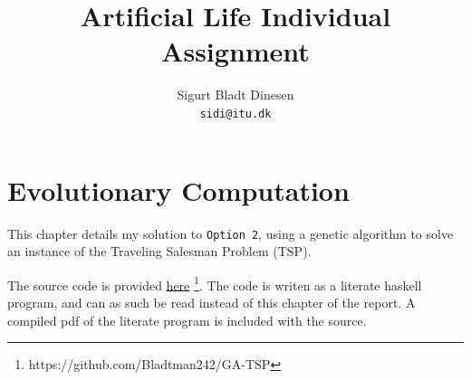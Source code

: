 \documentclass[a4paper, titlepage]{report}
\renewcommand{\%}{\scalebox{.9}{\oldpct}}
\begin{document}
\title{Artificial Life Individual Assignment}
\author{
	Sigurt Bladt Dinesen
	\\\texttt{sidi@itu.dk}
}

\maketitle

\tableofcontents
\chapter{Evolutionary Computation}
This chapter details my solution to \texttt{Option 2}, using a genetic algorithm
to solve an instance of the Traveling Salesman Problem (TSP).

The source code is provided \href{https://github.com/Bladtman242/GA-TSP}{here}
\footnote{https://github.com/Bladtman242/GA-TSP }. The code is writen as a
literate haskell program, and can as such be read instead of this chapter of the
report. A compiled pdf of the literate program is included with the source.
\end{document}
